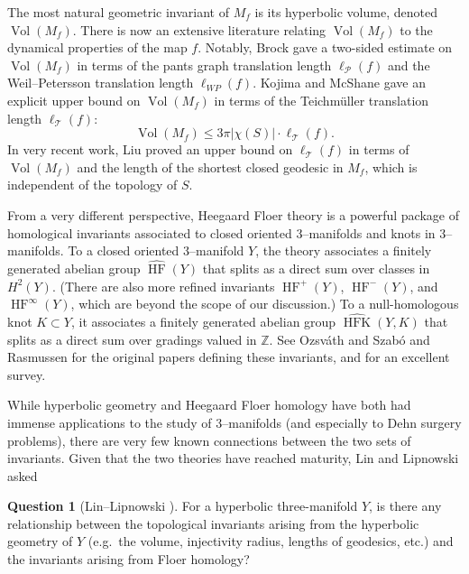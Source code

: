 \documentclass[11pt,letterpaper]{amsart}
\newcommand{\ZZ}[0]{\mathbb{Z}}
\newcommand{\mc}{\mathcal}
\newcommand{\teich}{\mathcal T}
\newcommand{\HFK}{\operatorname{HFK}}
\newcommand{\HF}{\operatorname{HF}}
\numberwithin{equation}{section}
\theoremstyle{definition}
\newtheorem{question}[theorem]{Question}
\DeclareMathOperator{\vol}{Vol}
\begin{document}
The most natural geometric invariant of $M_f$ is its hyperbolic volume, denoted $\vol(M_f)$.  There is now an extensive literature relating $\vol(M_f)$ to the dynamical properties of the map $f$. Notably, Brock \cite{Brock:fibered} gave a two-sided estimate on $\vol(M_f)$ in terms of the 
pants graph translation length $\ell_{\mc P}(f)$ and the Weil--Petersson translation length $\ell_{WP}(f)$. Kojima and McShane \cite{KojimaMcShane} gave an explicit upper bound on $\vol(M_f)$ in terms of the Teichm\"uller translation length $\ell_\teich(f)$:
\begin{equation}\label{Eqn:KojimaMcShane}
\vol(M_f) \leq 3\pi | \chi(S) | \cdot \ell_\teich(f).
\end{equation}
In very recent work, Liu \cite{Liu:EntropyVolume} proved an upper bound on $\ell_\teich(f)$ in terms of $\vol(M_f)$ and the length of the shortest closed geodesic in $M_f$, which is independent of the topology of $S$.

From a very different perspective, Heegaard Floer theory is a powerful package of homological invariants associated to closed oriented $3$--manifolds and knots in $3$--manifolds. To a closed oriented $3$--manifold $Y$, the theory associates a finitely generated abelian group $\widehat{\HF}(Y)$ that splits as a direct sum over classes in $H^2(Y)$. (There are also more refined invariants $\HF^+(Y)$, $\HF^-(Y)$, and $\HF^\infty(Y)$, which are beyond the scope of our discussion.) To a null-homologous knot $K \subset Y$, it associates a finitely generated abelian group $\widehat{\HFK}(Y, K)$ that splits as a direct sum over gradings valued in $\ZZ$. See Ozsv\'ath and Szab\'o \cite{OS1, OS2, OS:Knot} and Rasmussen \cite{Rasmussen:Thesis} for the original papers defining these invariants, and \cite{OS:Introduction} for an excellent survey.

While hyperbolic geometry and Heegaard Floer homology have both had immense applications to the study of $3$--manifolds (and especially to Dehn surgery problems), there are very few known connections between the two sets of invariants. Given that the two theories have reached maturity, Lin and Lipnowski asked

\begin{question}[Lin--Lipnowski \cite{LinLipnowski:SWLength}]\label{Quest:LL}
 For a hyperbolic three-manifold $Y$, is there any relationship between the topological
invariants arising from the hyperbolic geometry of $Y$ (e.g.\ the volume, injectivity radius,
lengths of geodesics, etc.) and the invariants arising from Floer homology?
\end{question}
\end{document}
